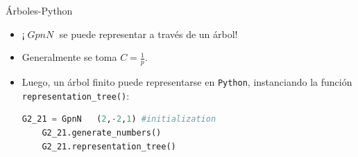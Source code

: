 \documentclass{beamer}
\theoremstyle{definition}
\numberwithin{equation}{section}
\DeclareMathOperator{\gpn}{\mathit{{GpnN}}}
\begin{document}
\begin{frame}[fragile]{Árboles-Python}
\begin{itemize}
	\item ¡$\gpn$ se puede representar a través de un árbol!
	\item Generalmente se toma $C=\frac{1}{p}$.
	\item Luego, un árbol finito puede representarse en \texttt{Python}, instanciando la función \texttt{representation\_tree()}:
	\begin{lstlisting}[language = Python, caption = Representación en árbol de $\mathit{G2\_21}$,basicstyle=\tiny]
	G2_21 = GpnN   (2,-2,1) #initialization
	G2_21.generate_numbers()
	G2_21.representation_tree()
	\end{lstlisting}
\end{itemize}
\end{frame}
\end{document}
